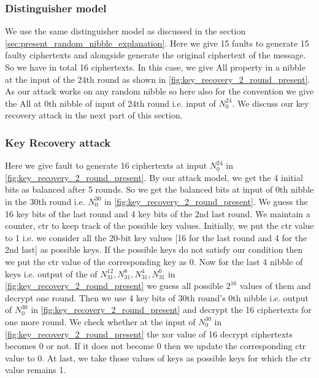 \subsubsection{Distinguisher model}
We use the same distinguisher model as discussed in the section \ref{sec:present_random_nibble_explanation}. Here we give 15 faults to generate 15 faulty ciphertexts and alongside generate the original ciphertext of the message. So we have in total 16 ciphertexts. In this case, we give All property in a nibble at the input of the 24th round as shown in \autoref{fig:key_recovery_2_round_present}. As our attack works on any random nibble so here also for the convention we give the All at 0th nibble of input of 24th round i.e. input of $N_0^{24}$. We discuss our key recovery attack in the next part of this section.


\subsubsection{Key Recovery attack}
Here we give fault to generate 16 ciphertexts at input $N_0^{24}$ in \autoref{fig:key_recovery_2_round_present}. By our attack model, we get the 4 initial bits as balanced after 5 rounds. So we get the balanced bits at input of 0th nibble in the 30th round i.e. $N_0^{30}$ in \autoref{fig:key_recovery_2_round_present}. We guess the 16 key bits of the last round and 4 key bits of the 2nd last round. We maintain a counter, ctr to keep track of the possible key values. Initially, we put the ctr value to 1 i.e. we consider all the 20-bit key values [16 for the last round and 4 for the 2nd last] as possible keys. If the possible keys do not satisfy our condition then we put the ctr value of the corresponding key as 0. Now for the last 4 nibble of keys i.e. output of the \sbb of $N_{31}^{12}, N_{31}^{8},N_{31}^{4},N_{31}^{0}$ in \autoref{fig:key_recovery_2_round_present} we guess all possible $2^{16}$ values of them and decrypt one round. Then we use 4 key bits of 30th round's 0th nibble i.e. output of $N_{0}^{30}$ in \autoref{fig:key_recovery_2_round_present} and decrypt the 16 ciphertexts for one more round. We check whether at the input of $N_{0}^{30}$ in \autoref{fig:key_recovery_2_round_present} the xor value of 16 decrypt ciphertexts becomes 0 or not. If it does not become 0 then we update the corresponding ctr value to 0. At last, we take those values of keys as possible keys for which the ctr value remains 1.
 
